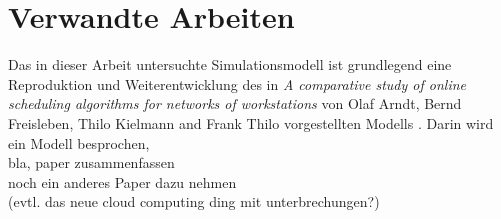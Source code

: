 \chapter{Verwandte Arbeiten}
\label{chap:related_work}
Das in dieser Arbeit untersuchte Simulationsmodell ist grundlegend eine Reproduktion und Weiterentwicklung des in 
\emph{A comparative study of online scheduling algorithms for networks
of workstations}
von Olaf Arndt, Bernd Freisleben, Thilo Kielmann and Frank Thilo vorgestellten Modells \cite{Arn99}.
Darin wird ein Modell besprochen, \\
bla, paper zusammenfassen\\
noch ein anderes Paper dazu nehmen\\
(evtl. das neue cloud computing ding mit unterbrechungen?)



